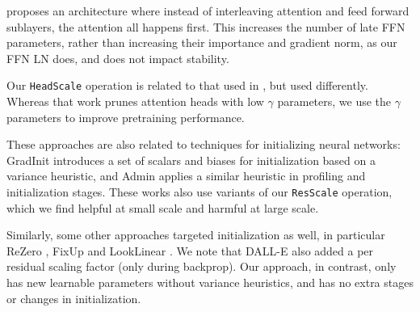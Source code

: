 \documentclass{article} %
\begin{document}
\citet{press2020improving} proposes an architecture where instead of interleaving attention and feed forward sublayers, the attention all happens first. This increases the number of late FFN parameters, rather than increasing their importance and gradient norm, as our FFN LN does, and does not impact stability.

Our \texttt{HeadScale} operation is related to that used in \citet{chen2021earlybert}, but used differently. Whereas that work prunes attention heads with low $\gamma$ parameters, we use the $\gamma$ parameters to improve pretraining performance.

These approaches are also related to techniques for initializing neural networks: GradInit \citep{zhu2021gradinit} introduces a set of scalars and biases for initialization based on a variance heuristic, and Admin \citep{liu2020understanding} applies a similar heuristic in profiling and initialization stages. These works  also use variants of our \texttt{ResScale} operation, which we find helpful at small scale and harmful at large scale.

Similarly, some other approaches targeted initialization as well, in particular ReZero \citep{bachlechner2020rezero}, FixUp \citep{huang2020improving} and LookLinear \citep{balduzzi2017shattered}. We note that DALL-E \citep{ramesh2021zero} also added a per residual scaling factor (only during backprop).
Our approach, in contrast, only has new learnable parameters without variance heuristics, and has no extra stages or changes in initialization.
\end{document}
